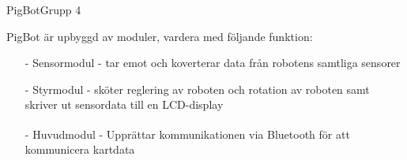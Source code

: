 \begin{frame}[fragile]{PigBot}{Grupp 4}

PigBot är upbyggd av moduler, vardera med följande funktion:
  \begin{itemize}
\pause
    \item[-] Sensormodul - tar emot och koverterar data från robotens samtliga sensorer
\pause
    \item[-] Styrmodul - sköter reglering av roboten och rotation av roboten samt skriver ut sensordata till en LCD-display
\pause
    \item[-] Huvudmodul - Upprättar kommunikationen via Bluetooth\textsuperscript{\circledR} för att kommunicera kartdata
  \end{itemize}
\end{frame}


